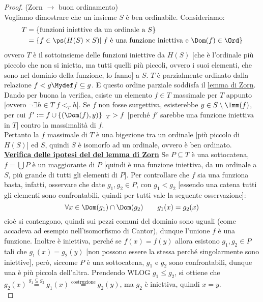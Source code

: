 \documentclass[11pt]{scrartcl}
\begin{document}
\begin{proof}
	(Zorn $\rightarrow$ buon ordinamento)\\
	Vogliamo dimostrare che un insieme $S$ è ben ordinabile. Consideriamo:
	\[ \begin{split}
		T &= \{\text{funzioni iniettive da un ordinale a $S$}\} \\
		  &= \{f \in \ps(H(S) \times S) | \; \text{$f$ è una funzione iniettiva e $\Dom(f) \in \Ord$}\}
	\end{split}
		\]
	ovvero $T$ è il sottoinsieme delle funzioni iniettive da $H(S)$ [che è l'ordinale più piccolo che non si inietta, ma tutti quelli più piccoli, ovvero i suoi elementi, che sono nel dominio della funzione, lo fanno] a $S$.
	$T$ è parzialmente ordinato dalla relazione $f < g \Mydef f \subseteq g$. E questo ordine parziale soddisfa il \hyperref[Zorn]{lemma di Zorn}.
	Dando per buona la verifica, esiste un elemento $f \in T$ massimale per $T$ appunto [ovvero $\neg \exists h \in T \; f <_T h$]. Se $f$ non fosse surgettiva, esisterebbe $y \in S \setminus \Imm(f)$,
	per cui $f' := f \cup \{(\Dom(f),y)\} \hspace{0.2cm}{}_{T}> f$ [perché $f'$ sarebbe una funzione iniettiva in $T$] contro la massimalità di $f$.\\
	Pertanto la $f$ massimale di $T$ è una bigezione tra un ordinale [più piccolo di $H(S)$] ed $S$, quindi $S$ è isomorfo ad un ordinale, ovvero è ben ordinato.\\
	\underline{\textbf{Verifica delle ipotesi del del lemma di Zorn}} Se $P \subseteq T$ è una sottocatena, $f = \bigcup P$ è un maggiorante di $P$ [quindi è una funzione iniettiva, da un ordinale a $S$, più grande di tutti gli elementi di $P$]. Per controllare che $f$ sia una funziona basta, infatti, osservare che date $g_1,g_2 \in P$, con $g_1 < g_2$ [essendo una catena tutti gli elementi sono confrontabili, quindi per tutti vale la seguente osservazione]:
	\[ \forall x \in \Dom(g_1) \cap \Dom(g_2) \qquad g_1(x) = g_2(x)
		\]
	cioè si contengono, quindi sui pezzi comuni del dominio sono uguali (come accadeva ad esempio nell'isomorfismo di Cantor), dunque l'unione $f$ è una funzione. Inoltre è iniettiva, perché se $f(x) = f(y)$ allora esistono $g_1,g_2 \in P$ tali che $g_1(x) = g_2(y)$ [non possono essere la stessa perché singolarmente sono iniettive], però, siccome $P$ è una sottocatena, 
	$g_1$ e $g_2$ sono confrontabili, dunque una è più piccola dell'altra. Prendendo WLOG $g_1 \leq g_2$, si ottiene che $g_2(x) \overset{g_1 \subseteq g_2}{=} g_1(x) \overset{\text{costruzione}}{=} g_2(y)$, ma $g_2$ è iniettiva, quindi $x = y$.\\

\end{proof}
\end{document}
